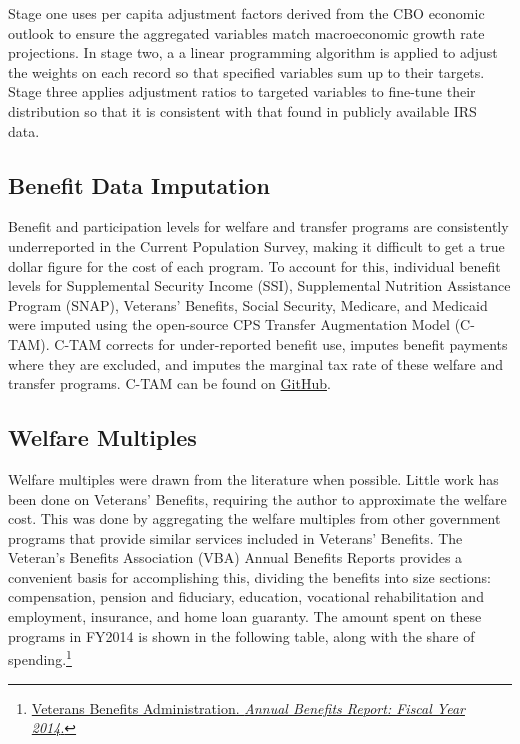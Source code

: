 \documentclass{article}
\begin{document}
Stage one uses per capita adjustment factors derived from the CBO economic outlook to ensure the aggregated variables match macroeconomic growth rate projections. In stage two, a a linear programming algorithm is applied to adjust the weights on each record so that specified variables sum up to their targets. Stage three applies adjustment ratios to targeted variables to fine-tune their distribution so that it is consistent with that found in publicly available IRS data.

\subsection{Benefit Data Imputation}
Benefit and participation levels for welfare and transfer programs are consistently underreported in the Current Population Survey, making it difficult to get a true dollar figure for the cost of each program. To account for this, individual benefit levels for Supplemental Security Income (SSI), Supplemental Nutrition Assistance Program (SNAP), Veterans’ Benefits, Social Security, Medicare, and Medicaid were imputed using the open-source CPS Transfer Augmentation Model (C-TAM). C-TAM corrects for under-reported benefit use, imputes benefit payments where they are excluded, and imputes the marginal tax rate of these welfare and transfer programs. C-TAM can be found on \href{http://www.github.com/open-source-economics/benefits}{GitHub}.


\subsection{Welfare Multiples}

Welfare multiples were drawn from the literature when possible. Little work has been done on Veterans' Benefits, requiring the author to approximate the welfare cost. This was done by aggregating the welfare multiples from other government programs that provide similar services included in Veterans' Benefits. The Veteran's Benefits Association (VBA) Annual Benefits Reports provides a convenient basis for accomplishing this, dividing the benefits into size sections: compensation, pension and fiduciary, education, vocational rehabilitation and employment, insurance, and home loan guaranty. The amount spent on these programs in FY2014 is shown in the following table, along with the share of spending.\footnote{\href{http://www.benefits.va.gov/REPORTS/abr/ABR-IntroAppendix-FY14-11032015.pdf}{Veterans Benefits Administration. \textit{Annual Benefits Report: Fiscal Year 2014}.}}
\end{document}
